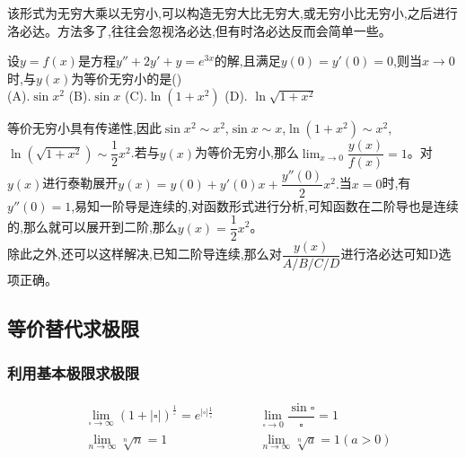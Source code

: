 \documentclass[9pt a4paper, oneside, UTF8]{ctexbook}
\begin{document}
\begin{sloppypar}
\begin{solution}
    \end{solution}
    \begin{note}
        该形式为无穷大乘以无穷小,可以构造无穷大比无穷大,或无穷小比无穷小,之后进行洛必达。方法多了,往往会忽视洛必达,但有时洛必达反而会简单一些。
    \end{note}
    \begin{problem}
        设$y=f(x)$是方程$y''+2y'+y=e^{3x}$的解,且满足$y(0)=y'(0)=0$,则当$x\to 0$时,与$y(x)$为等价无穷小的是()\\
        (A).$\sin x^2$ \qquad (B).$\sin x$ \qquad (C).$\ln(1+x^2)$ \qquad (D). $\ln \sqrt{1+x^2}$
    \end{problem}
    \begin{solution}
        等价无穷小具有传递性,因此$\sin x^2 \sim x^2$,$\sin x \sim x$,$\ln (1+x^2) \sim x^2$,$\ln (\sqrt{1+x^2})\sim \dfrac{1}{2}x^2$.若与$y(x)$为等价无穷小,那么$\lim_{x\to 0}\dfrac{y(x)}{f(x)}=1$。对$y(x)$进行泰勒展开$y(x)=y(0)+y'(0)x+\dfrac{y''(0)}{2}x^2.$当$x=0$时,有$y''(0)=1$,易知一阶导是连续的,对函数形式进行分析,可知函数在二阶导也是连续的,那么就可以展开到二阶,那么$y(x)=\dfrac{1}{2}x^2$。\\
        除此之外,还可以这样解决,已知二阶导连续,那么对$\dfrac{y(x)}{A/B/C/D}$进行洛必达可知D选项正确。
    \end{solution}
    \subsection{等价替代求极限}
    \subsubsection{利用基本极限求极限}
    \begin{align*} \boxed
        {
            \begin{aligned}
                 & \lim_{\square \to \infty }(1+|\square|)^{\frac{1}{\square}}=e^{|\square| \frac{1}{\square}} \qquad    & &  \lim _ { \square \rightarrow 0 } \dfrac { \sin \square } { \square } = 1 \\
                 & \lim_{n \to \infty }\sqrt[n]{n}=1 \qquad & & \lim_{n \to \infty} \sqrt[n]{a}=1(a>0)\\
            \end{aligned}
        }
    \end{align*}

\end{sloppypar}
\end{document}
